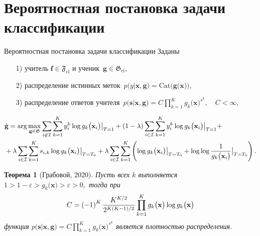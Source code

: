 \documentclass[10pt,pdf,hyperref={unicode}]{beamer}
\newtheorem{rustheorem}{Теорема}
\begin{document}
\section{Вероятностная постановка задачи классификации}
\begin{frame}{Вероятностная постановка задачи классификации}
Заданы
\begin{enumerate}
	\item[1)] учитель $\mathbf{f}\in\mathfrak{F}_{\text{cl}}$ и ученик~$\mathbf{g}\in\mathfrak{G}_{\text{cl}}$,
	\item[2)] распределение истинных меток~$p\bigr(y|\mathbf{x}, \mathbf{g}\bigr) = \text{Cat}\bigr(\mathbf{g}\bigr(\mathbf{x}\bigr)\bigr)$,
	\item[3)] распределение ответов учителя~$p\bigr(\mathbf{s}|\mathbf{x}, \mathbf{g}\bigr) = C\prod_{k=1}^{K}g_k\bigr(\mathbf{x}\bigr)^{s^k}, \quad C < \infty,$
\end{enumerate}
\[
\setlength\abovedisplayskip{0pt}
\begin{aligned}
&\hat{\mathbf{g}} = \arg\max_{\mathbf{g}\in \mathfrak{G}} \sum_{i\not\in \mathcal{I}}\sum_{k=1}^{K}y_i^k\log g_k\bigr(\mathbf{x}_i\bigr)\bigr|_{T=1} 
+ \left(1-\lambda\right)\sum_{i\in \mathcal{I}}\sum_{k=1}^{K}y_i^k\log g_k\bigr(\mathbf{x}_i\bigr)\bigr|_{T=1} +\\
&+ \lambda\sum_{i\in \mathcal{I}}\sum_{k=1}^{K}s_{i,k}\log g_k\bigr(\mathbf{x}_i\bigr)\bigr|_{T=T_0} 
+ \lambda \sum_{i\in \mathcal{I}}\sum_{k=1}^{K}\left(\log g_k\bigr(\mathbf{x}_i\bigr)\bigr|_{T=T_0} + \log\log\frac{1}{g_k\bigr(\mathbf{x}_i\bigr)}\bigr|_{T=T_0}\right).
\end{aligned}
\setlength\belowdisplayskip{0pt}
\]

\begin{rustheorem}[Грабовой, 2020]
\justifying
\label{theorem:st:dist}
Пусть всех $k$ выполняется $1 > 1- \varepsilon > g_k\bigr(\mathbf{x}\bigr) > \varepsilon > 0,$ тогда при
\[
\setlength\abovedisplayskip{0pt}
C=\left(-1\right)^{K}\frac{K^{K/2}}{2^{K(K-1)/2}}\prod_{k=1}^{K}g_k\bigr(\mathbf{x}\bigr)\log g_k\bigr(\mathbf{x}\bigr)
\setlength\belowdisplayskip{0pt}
\]
функция $p\bigr(\mathbf{s}|\mathbf{x}, \mathbf{g}\bigr) = C\prod_{k=1}^{K}g_k\bigr(\mathbf{x}\bigr)^{s^k}$ является плотностью распределения.
\end{rustheorem}

\end{frame}
\end{document}
